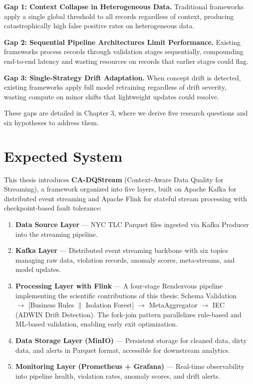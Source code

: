 \textbf{Gap 1: Context Collapse in Heterogeneous Data.} Traditional frameworks apply a single global threshold to all records regardless of context, producing catastrophically high false positive rates on heterogeneous data.

\textbf{Gap 2: Sequential Pipeline Architectures Limit Performance.} Existing frameworks process records through validation stages sequentially, compounding end-to-end latency and wasting resources on records that earlier stages could flag.

\textbf{Gap 3: Single-Strategy Drift Adaptation.} When concept drift is detected, existing frameworks apply full model retraining regardless of drift severity, wasting compute on minor shifts that lightweight updates could resolve.

These gaps are detailed in Chapter 3, where we derive five research questions and six hypotheses to address them.

\section{Expected System}
This thesis introduces \textbf{CA-DQStream} (Context-Aware Data Quality for Streaming), a framework organized into five layers, built on Apache Kafka \citep{kafkaintro2024} for distributed event streaming and Apache Flink \citep{flinkdocs2024} for stateful stream processing with checkpoint-based fault tolerance:

\begin{enumerate}
    \item \textbf{Data Source Layer} --- NYC TLC Parquet files ingested via Kafka Producer into the streaming pipeline.
    \item \textbf{Kafka Layer} --- Distributed event streaming backbone with six topics managing raw data, violation records, anomaly scores, meta-streams, and model updates.
    \item \textbf{Processing Layer with Flink} --- A four-stage Rendezvous pipeline implementing the scientific contributions of this thesis: Schema Validation $\rightarrow$ [Business Rules $\parallel$ Isolation Forest] $\rightarrow$ MetaAggregator $\rightarrow$ IEC (ADWIN Drift Detection). The fork-join pattern parallelizes rule-based and ML-based validation, enabling early exit optimization.
    \item \textbf{Data Storage Layer (MinIO)} --- Persistent storage for cleaned data, dirty data, and alerts in Parquet format, accessible for downstream analytics.
    \item \textbf{Monitoring Layer (Prometheus + Grafana)} --- Real-time observability into pipeline health, violation rates, anomaly scores, and drift alerts.
\end{enumerate}

